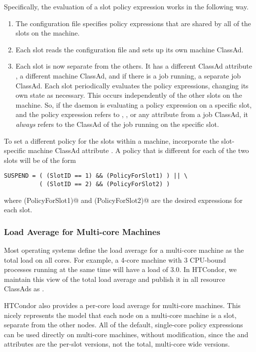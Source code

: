 Specifically, the evaluation of a slot policy expression works in
the following way.
\begin{enumerate}
\item 
The configuration file specifies policy expressions that are shared by
all of the slots on the machine.
\item 
Each slot reads the configuration file and sets up its own machine ClassAd.
\item 
Each slot is now separate from the others.  It has a
different ClassAd attribute ,
a different machine ClassAd, 
and if there is a job running, a separate job ClassAd.
Each slot periodically
evaluates the policy expressions, changing its own state as necessary.
This occurs independently of the other slots on the machine.
So, if the  daemon is evaluating a policy expression
on a specific slot,
and the policy expression refers to , ,
or any attribute from a job ClassAd,
it \emph{always} refers to the ClassAd of the
job running on the specific slot.
\end{enumerate}

To set a different policy for the slots within a machine,
incorporate the slot-specific machine ClassAd attribute .
A  policy that is different for each of the two slots
will be of the form
\begin{verbatim}
SUSPEND = ( (SlotID == 1) && (PolicyForSlot1) ) || \
          ( (SlotID == 2) && (PolicyForSlot2) )
\end{verbatim}
where \verb@(PolicyForSlot1)@ and \verb@(PolicyForSlot2)@ are the
desired expressions for each slot.

\subsubsection{\label{sec:Multi-core-Load}
Load Average for Multi-core Machines}

Most operating systems define the load average for a multi-core machine as
the total load on all cores.
For example, a 4-core machine with 3 CPU-bound processes
running at the same time will have a load of 3.0.
In HTCondor, we maintain this view of the total load average and publish
it in all resource ClassAds as \Attr{TotalLoadAvg}.

HTCondor also provides a per-core load average for multi-core machines.
This nicely represents the model that each node on a multi-core machine
is a slot,
separate from the other nodes.
All of the default, single-core policy expressions can be used directly
on multi-core machines, without modification, since the \Attr{LoadAvg} and
\Attr{CondorLoadAvg} attributes are the per-slot versions,
not the total, multi-core wide versions.

